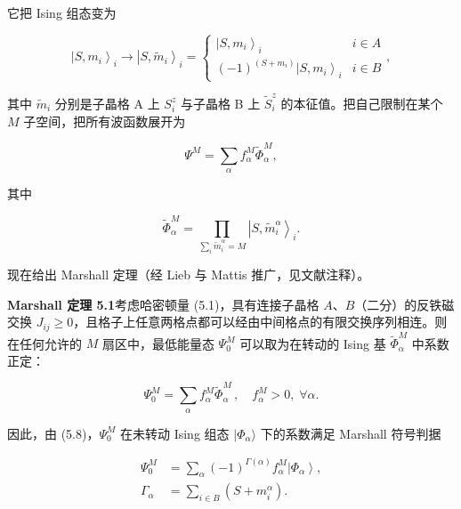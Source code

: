 它把 Ising 组态变为

\begin{equation*}
\left| S, m _ {i} \right\rangle_ {i} \to \left| S, \tilde {m} _ {i} \right\rangle_ {i} = \left\{ \begin{array}{ll} \left| S, m _ {i} \right\rangle_ {i} & i \in A \\ (- 1)^{(S + m _ {i})} \left| S, m _ {i} \right\rangle_ {i} & i \in B \end{array} \right. ,
\tag{5.9}
\end{equation*}

其中 $\tilde{m}_{i}$ 分别是子晶格 A 上 $S_{i}^{z}$ 与子晶格 B 上 $\tilde{S}_{i}^{z}$ 的本征值。把自己限制在某个 $M$ 子空间，把所有波函数展开为

\begin{equation*}
\Psi^ {M} = \sum_ {\alpha} f _ {\alpha} ^ {M} \tilde {\Phi} _ {\alpha} ^ {M},
\tag{5.10}
\end{equation*}

其中

\begin{equation*}
\tilde {\Phi} _ {\alpha} ^ {M} = \prod_{\sum_i \tilde m_i^\alpha = M} \left| S, \tilde {m} _ {i} ^ {\alpha} \right\rangle_ {i}.
\tag{5.11}
\end{equation*}

现在给出 Marshall 定理（经 Lieb 与 Mattis 推广，见文献注释）。

\medskip
\noindent\textbf{Marshall 定理 5.1}\quad 考虑哈密顿量 (5.1)，具有连接子晶格 $A$、$B$（二分）的反铁磁交换 $J_{ij} \geq 0$，且格子上任意两格点都可以经由中间格点的有限交换序列相连。则在任何允许的 $M$ 扇区中，最低能量态 $\Psi_0^M$ 可以取为在转动的 Ising 基 $\tilde{\Phi}_{\alpha}^{M}$ 中系数正定：

\begin{equation*}
\Psi_ {0} ^ {M} = \sum_ {\alpha} f _ {\alpha} ^ {M} \tilde {\Phi} _ {\alpha} ^ {M} \, , \quad f _ {\alpha} ^ {M} > 0, \; \forall \alpha .
\tag{5.12}
\end{equation*}
\medskip

因此，由 (5.8)，$\Psi_0^M$ 在未转动 Ising 组态 $|\Phi_{\alpha}\rangle$ 下的系数满足 Marshall 符号判据

\begin{align*}
\Psi_ {0} ^ {M} & = \sum_ {\alpha} ( - 1 ) ^ {\Gamma ( \alpha )} f _ {\alpha} ^ {M} \left| \Phi_ {\alpha} \right\rangle ,\\
\Gamma_ {\alpha} & = \sum_ {i \in B} \left( S + m _ {i} ^ {\alpha} \right) .
\tag{5.13}
\end{align*}

